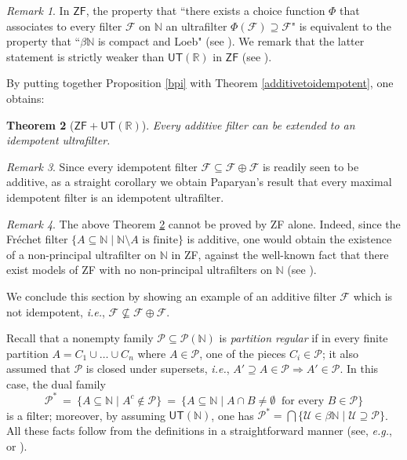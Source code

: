 \documentclass{amsart}
\newtheorem{theorem}{Theorem}[section]
\theoremstyle{definition}
\theoremstyle{remark}
\newtheorem{remark}[theorem]{Remark}
\def\F{\mathscr{F}}
\def\PP{\mathcal{P}}
\def\Ps{\mathscr{P}}
\def\U{\mathscr{U}}
\def\N{\mathbb{N}}
\def\R{\mathbb{R}}
\begin{document}
\begin{remark}
\label{rem:Prop3_4}
In $\textsf{ZF}$, the property that ``there exists a choice function $\Phi$ that
associates to every filter $\F$ on $\N$
an ultrafilter $\Phi(\F)\supseteq\F$" is equivalent to 
the property that ``$\beta\N$ is compact and Loeb" 
(see \cite[Proposition 1(ii)]{hkt}). We remark that the
latter statement is strictly weaker than $\mathsf{UT}(\R)$ in 
$\mathsf{ZF}$ (see \cite[Theorem 10]{kk}).  
\end{remark} 

By putting together Proposition \ref{bpi} with
Theorem \ref{additivetoidempotent}, one obtains:

\begin{theorem}[$\textsf{ZF}+\textsf{UT}(\R)$]\label{main}
Every additive filter can be extended
to an idempotent ultrafilter.
\end{theorem}

\begin{remark}
Since every idempotent filter $\F\subseteq\F\oplus\F$ is readily seen to be
additive, as a straight corollary we obtain Paparyan's result \cite{p}
that every maximal idempotent filter is an idempotent ultrafilter.
\end{remark}

\begin{remark}
The above Theorem \ref{main}
cannot be proved by \textsf{ZF} alone.
Indeed, since the Fr\'{e}chet filter
$\{A\subseteq\N\mid \N\setminus A \text{ is finite}\}$
is additive, one would obtain the existence of a non-principal 
ultrafilter on $\N$ in \textsf{ZF}, against 
the well-known fact that there exist models of \textsf{ZF}
with no non-principal ultrafilters on $\N$ (see \cite{hr}).
\end{remark}


We conclude this section by showing an example of an additive filter
$\F$ which is not idempotent, \emph{i.e.}, $\F\not\subseteq\F\oplus\F$.

Recall that a nonempty family $\Ps\subseteq\PP(\N)$ is \emph{partition regular}
if in every finite partition $A=C_1\cup\ldots\cup C_n$ 
where $A\in\Ps$, one of the pieces $C_i\in\Ps$;
it also assumed that $\Ps$ is closed under supersets,
\emph{i.e.}, $A'\supseteq A\in\Ps\Rightarrow A'\in\Ps$.
In this case, the dual family 
$$\Ps^*\ =\ 
\{A\subseteq\N\mid A^c\notin\Ps\}\ =\ 
\{A\subseteq\N\mid A\cap B\ne\emptyset\ \text{ for every }B\in\Ps\}$$
is a filter; moreover, by assuming $\textsf{UT}(\N)$, one has 
$\Ps^*=\bigcap\{\U\in\beta\N\mid \U\supseteq\Ps\}$.
All these facts follow from the definitions in
a straightforward manner (see, \emph{e.g.},
\cite[Theorem 3.11]{hs} or \cite{bh}).
\end{document}
